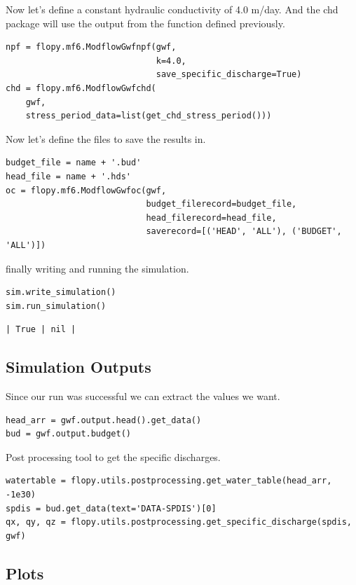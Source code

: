 \documentclass[titlepage,12pt]{unisubmission}
\begin{document}
Now let's define a constant hydraulic conductivity of 4.0 m/day. And the chd package will use the output from the function defined previously.

\begin{verbatim}
npf = flopy.mf6.ModflowGwfnpf(gwf,
                              k=4.0,
                              save_specific_discharge=True)
chd = flopy.mf6.ModflowGwfchd(
    gwf,
    stress_period_data=list(get_chd_stress_period()))
\end{verbatim}

Now let's define the files to save the results in.

\begin{verbatim}
budget_file = name + '.bud'
head_file = name + '.hds'
oc = flopy.mf6.ModflowGwfoc(gwf,
                            budget_filerecord=budget_file,
                            head_filerecord=head_file,
                            saverecord=[('HEAD', 'ALL'), ('BUDGET', 'ALL')])
\end{verbatim}

finally writing and running the simulation.

\begin{verbatim}
sim.write_simulation()
sim.run_simulation()
\end{verbatim}

\begin{verbatim}
| True | nil |
\end{verbatim}

\subsection{Simulation Outputs}
\label{sec:orgf7fe331}

Since our run was successful we can extract the values we want.
\begin{verbatim}
head_arr = gwf.output.head().get_data()
bud = gwf.output.budget()
\end{verbatim}

Post processing tool to get the specific discharges.

\begin{verbatim}
watertable = flopy.utils.postprocessing.get_water_table(head_arr, -1e30)
spdis = bud.get_data(text='DATA-SPDIS')[0]
qx, qy, qz = flopy.utils.postprocessing.get_specific_discharge(spdis, gwf)
\end{verbatim}

\subsection{Plots}
\label{sec:org4fe239a}
\end{document}
